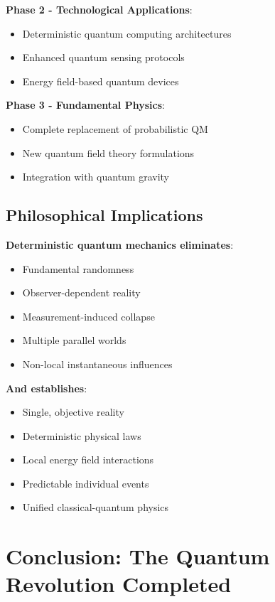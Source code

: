 \documentclass[12pt,a4paper]{article}
\begin{document}
	\textbf{Phase 2 - Technological Applications}:
	\begin{itemize}
		\item Deterministic quantum computing architectures
		\item Enhanced quantum sensing protocols
		\item Energy field-based quantum devices
	\end{itemize}
	
	\textbf{Phase 3 - Fundamental Physics}:
	\begin{itemize}
		\item Complete replacement of probabilistic QM
		\item New quantum field theory formulations
		\item Integration with quantum gravity
	\end{itemize}
	
	\subsection{Philosophical Implications}
	
	\begin{tcolorbox}[colback=purple!5!white,colframe=purple!75!black,title=The End of Quantum Mysticism]
		\textbf{Deterministic quantum mechanics eliminates}:
		\begin{itemize}
			\item Fundamental randomness
			\item Observer-dependent reality
			\item Measurement-induced collapse
			\item Multiple parallel worlds
			\item Non-local instantaneous influences
		\end{itemize}
		
		\textbf{And establishes}:
		\begin{itemize}
			\item Single, objective reality
			\item Deterministic physical laws
			\item Local energy field interactions
			\item Predictable individual events
			\item Unified classical-quantum physics
		\end{itemize}
	\end{tcolorbox}
	
	\section{Conclusion: The Quantum Revolution Completed}
	
\end{document}
